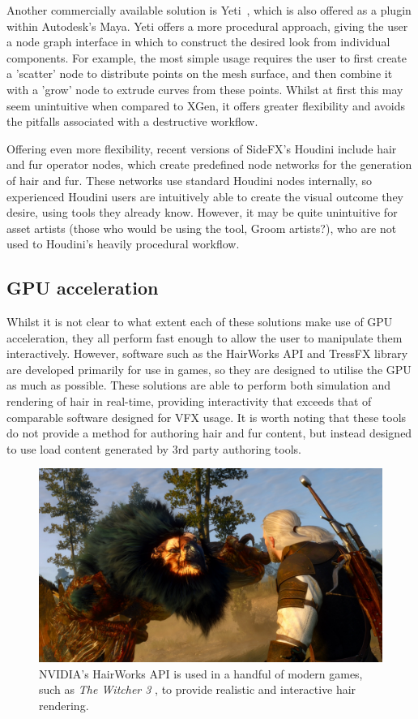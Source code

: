 \documentclass[]{acmsiggraph}
\begin{document}
Another commercially available solution is Yeti~\cite{yeti}, which is also offered as a plugin within Autodesk's Maya. Yeti offers a more procedural approach, giving the user a node graph interface in which to construct the desired look from individual components. For example, the most simple usage requires the user to first create a 'scatter' node to distribute points on the mesh surface, and then combine it with a 'grow' node to extrude curves from these points. Whilst at first this may seem unintuitive when compared to XGen, it offers greater flexibility and avoids the pitfalls associated with a destructive workflow.

Offering even more flexibility, recent versions of SideFX's Houdini include hair and fur operator nodes, which create predefined node networks for the generation of hair and fur. These networks use standard Houdini nodes internally, so experienced Houdini users are intuitively able to create the visual outcome they desire, using tools they already know. However, it may be quite unintuitive for asset artists (those who would be using the tool, Groom artists?), who are not used to Houdini's heavily procedural workflow.

\subsection{GPU acceleration} \label{sec:existingGPU}
Whilst it is not clear to what extent each of these solutions make use of GPU acceleration, they all perform fast enough to allow the user to manipulate them interactively. However, software such as the HairWorks \cite{hairworks} API and TressFX \cite{tressfx} library are developed primarily for use in games, so they are designed to utilise the GPU as much as possible. These solutions are able to perform both simulation and rendering of hair in real-time, providing interactivity that exceeds that of comparable software designed for VFX usage. It is worth noting that these tools do not provide a method for authoring hair and fur content, but instead designed to use load content generated by 3rd party authoring tools.

\begin{figure}[htbp]\centering
\includegraphics[width=1.0\linewidth]{images/hairworks}
\caption{\label{figure:hairworks} NVIDIA's HairWorks API is used in a handful of modern games, such as \textit{The Witcher 3} \protect\cite{witcher}, to provide realistic and interactive hair rendering.}
\end{figure}
\end{document}

